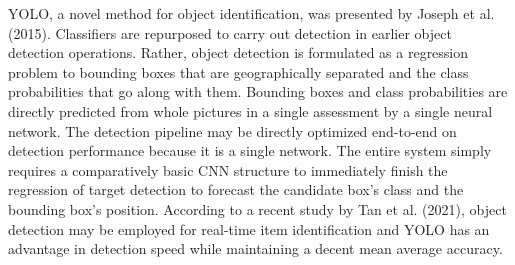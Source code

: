 YOLO, a novel method for object identification, was presented by Joseph et al. (2015). Classifiers are repurposed to carry out detection in earlier object detection operations. Rather, object detection is formulated as a regression problem to bounding boxes that are geographically separated and the class probabilities that go along with them. Bounding boxes and class probabilities are directly predicted from whole pictures in a single assessment by a single neural network. The detection pipeline may be directly optimized end-to-end on detection performance because it is a single network. The entire system simply requires a comparatively basic CNN structure to immediately finish the regression of target detection to forecast the candidate box's class and the bounding box's position. According to a recent study by Tan et al. (2021), object detection may be employed for real-time item identification and YOLO has an advantage in detection speed while maintaining a decent mean average accuracy.

